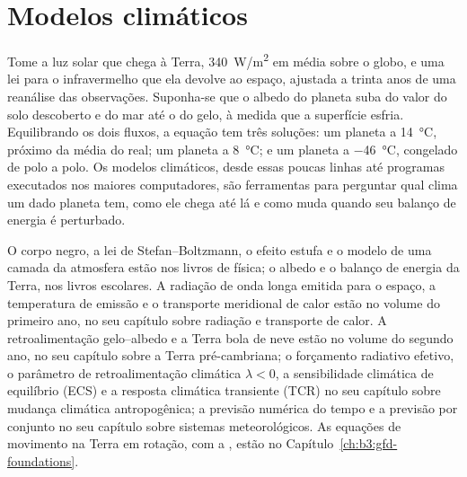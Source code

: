 \chapter{Modelos climáticos}\label{ch:b3:climate-models}

Tome a luz solar que chega à Terra, \qty{340}{W/m^2} em média sobre o
globo, e uma lei para o infravermelho que ela devolve ao espaço, ajustada a
trinta anos de uma reanálise das observações. Suponha-se que o albedo do planeta suba do valor do
solo descoberto e do mar até o do gelo, à medida que a superfície esfria. Equilibrando os dois
fluxos, a equação tem três soluções: um planeta a
\qty{14}{\celsius}, próximo da média do real; um planeta a
\qty{8}{\celsius}; e um planeta a \qty{-46}{\celsius}, congelado de polo a
polo. Os modelos climáticos, desde essas poucas linhas até programas executados nos maiores
computadores, são ferramentas para perguntar qual clima um dado planeta tem, como ele
chega até lá e como muda quando seu balanço de energia é perturbado.

\begin{recall}
O corpo negro, a lei de Stefan--Boltzmann, o efeito estufa e o
modelo de uma camada da atmosfera estão nos livros de física; o albedo e
o balanço de energia da Terra, nos livros escolares. A radiação de onda longa
emitida para o espaço, a temperatura de emissão e o transporte meridional de calor estão
no volume do primeiro ano, no seu capítulo sobre radiação e transporte de calor. A
retroalimentação gelo--albedo e a Terra bola de neve estão no volume do segundo ano, no
seu capítulo sobre a Terra pré-cambriana; o forçamento radiativo efetivo, o
parâmetro de retroalimentação climática $\lambda < 0$, a sensibilidade climática de equilíbrio
(ECS) e a resposta climática transiente (TCR) no seu capítulo
sobre mudança climática antropogênica; a previsão numérica do tempo e a
previsão por conjunto no seu capítulo sobre sistemas meteorológicos. As equações de
movimento na Terra em rotação, com a , estão no
Capítulo~\ref{ch:b3:gfd-foundations}.
\end{recall}


